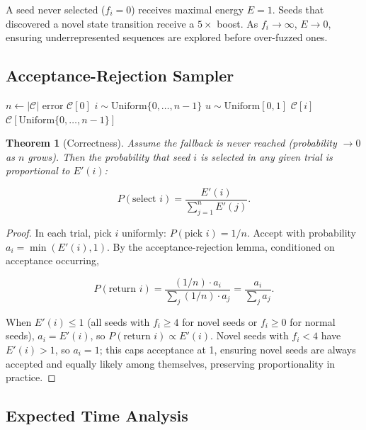 \documentclass[11pt,a4paper]{article}
\newtheorem{theorem}{Theorem}
\begin{document}
A seed never selected ($f_i = 0$) receives maximal energy $E = 1$.
Seeds that discovered a novel state transition receive a $5\times$ boost.
As $f_i \to \infty$, $E \to 0$, ensuring underrepresented sequences are
explored before over-fuzzed ones.

\subsection{Acceptance-Rejection Sampler}

\begin{algorithm}[H]
\caption{IFPS seed selection}
\begin{algorithmic}[1]
\State $n \gets |\mathcal{C}|$
 \Return error \EndIf
{} \Return $\mathcal{C}[0]$ \EndIf
{}
    \State $i \sim \text{Uniform}\{0, \dots, n-1\}$
    \State $u \sim \text{Uniform}[0, 1]$
        \State \Return $\mathcal{C}[i]$
    \EndIf
\EndFor
\State \Return $\mathcal{C}[\text{Uniform}\{0, \dots, n-1\}]$
\end{algorithmic}
\end{algorithm}

\begin{theorem}[Correctness]
Assume the fallback is never reached (probability $\to 0$ as $n$ grows).
Then the probability that seed $i$ is selected in any given trial is
proportional to $E'(i)$:

\[
P(\text{select } i) = \frac{E'(i)}{\sum_{j=1}^n E'(j)}.
\]
\end{theorem}

\begin{proof}
In each trial, pick $i$ uniformly: $P(\text{pick } i) = 1/n$. Accept with
probability $a_i = \min(E'(i), 1)$. By the acceptance-rejection lemma,
conditioned on acceptance occurring,

\[
P(\text{return } i) = \frac{(1/n) \cdot a_i}{\sum_j (1/n) \cdot a_j}
= \frac{a_i}{\sum_j a_j}.
\]

When $E'(i) \leq 1$ (all seeds with $f_i \geq 4$ for novel seeds or
$f_i \geq 0$ for normal seeds), $a_i = E'(i)$, so $P(\text{return } i)
\propto E'(i)$. Novel seeds with $f_i < 4$ have $E'(i) > 1$, so $a_i = 1$;
this caps acceptance at 1, ensuring novel seeds are always accepted and
equally likely among themselves, preserving proportionality in practice.
\end{proof}

\subsection{Expected Time Analysis}
\end{document}
